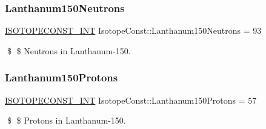 \subsubsection{\texorpdfstring{Lanthanum150\+Neutrons}{Lanthanum150Neutrons}}
{\footnotesize\ttfamily \mbox{\hyperlink{group___isotope_const-_macros_ga5f18360b3e99483a35c32d789e62621c}{I\+S\+O\+T\+O\+P\+E\+C\+O\+N\+S\+T\+\_\+\+I\+NT}} Isotope\+Const\+::\+Lanthanum150\+Neutrons = 93}

\$ \$ Neutrons in Lanthanum-\/150. \mbox{\label{group___isotope_const-_lanthanum-_la150_ga2bf687c46efeb6a16903fed73401afff}} 
\subsubsection{\texorpdfstring{Lanthanum150\+Protons}{Lanthanum150Protons}}
{\footnotesize\ttfamily \mbox{\hyperlink{group___isotope_const-_macros_ga5f18360b3e99483a35c32d789e62621c}{I\+S\+O\+T\+O\+P\+E\+C\+O\+N\+S\+T\+\_\+\+I\+NT}} Isotope\+Const\+::\+Lanthanum150\+Protons = 57}

\$ \$ Protons in Lanthanum-\/150. 